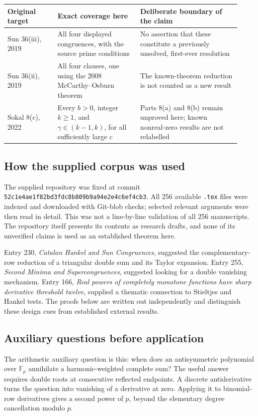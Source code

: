 \documentclass[11pt,a4paper]{article}
\theoremstyle{remark}
\newcommand{\Fp}{\mathbb F_p}
\begin{document}
\begin{center}
\small
\begin{tabular}{@{}>{\raggedright\arraybackslash}p{0.20\linewidth}>{\raggedright\arraybackslash}p{0.33\linewidth}>{\raggedright\arraybackslash}p{0.40\linewidth}@{}}
\toprule
Original target & Exact coverage here & Deliberate boundary of the claim\\
\midrule
Sun 36(iii), 2019 & All four displayed congruences, with the source prime conditions & No assertion that these constitute a previously unsolved, first-ever resolution\\[3pt]
Sun 36(ii), 2019 & All four clauses, one using the 2008 McCarthy--Osburn theorem & The known-theorem reduction is not counted as a new result\\[3pt]
Sokal 8(c), 2022 & Every $b>0$, integer $k\ge1$, and $\gamma\in(k-1,k)$, for all sufficiently large $c$ & Parts 8(a) and 8(b) remain unproved here; known nonreal-zero results are not relabelled\\
\bottomrule
\end{tabular}
\end{center}

\subsection{How the supplied corpus was used}
The supplied repository \cite{corpus} was fixed at commit
\texttt{52c1e4ae1f82bd3fdc8b809b9a94e2e4c6ef4cb3}.
All 256 available \texttt{.tex} files were indexed and downloaded with
Git-blob checks; selected relevant arguments were then read in detail.
This was not a line-by-line validation of all 256 manuscripts. The
repository itself presents its contents as research drafts, and none
of its unverified claims is used as an established theorem here.

Entry 230, \emph{Catalan Hankel and Sun Congruences}, suggested the
complementary-row reduction of a triangular double sum and its Taylor
expansion. Entry 255, \emph{Second Minima and Supercongruences}, suggested
looking for a double vanishing mechanism. Entry 166,
\emph{Real powers of completely monotone functions have sharp derivative
threshold twelve}, supplied a thematic
connection to Stieltjes and Hankel tests. The proofs below are written
out independently and distinguish these design cues from established
external results.

\subsection{Auxiliary questions before application}
The arithmetic auxiliary question is this: when does an antisymmetric
polynomial over $\Fp$ annihilate a harmonic-weighted complete sum?
The useful answer requires double roots at consecutive reflected
endpoints. A discrete antiderivative turns the question into vanishing
of a derivative at zero. Applying it to binomial-row derivatives gives
a second power of $p$, beyond the elementary degree cancellation
modulo $p$.
\end{document}
